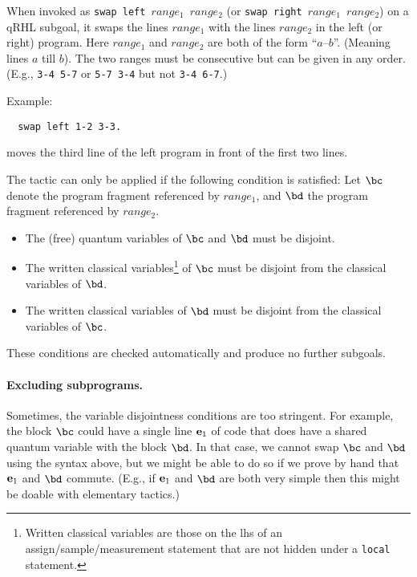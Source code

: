 \documentclass{article}
\begin{document}

When invoked as \texttt{swap left $\mathit{range_1}$ $\mathit{range_2}$} (or \texttt{swap
  right $\mathit{range_1}$ $\mathit{range_2}$}) on a qRHL subgoal, it swaps the lines $\mathit{range_1}$ with the lines $\mathit{range_2}$ in the left (or right) program.
Here $\mathit{range_1}$ and $\mathit{range_2}$ are both of the form ``$a$--$b$''.
(Meaning lines $a$ till $b$).
The two ranges must be consecutive but can be given in any order.
(E.g., \texttt{3-4 5-7} or \texttt{5-7 3-4} but not \texttt{3-4 6-7}.)

Example:
\begin{lstlisting}
  swap left 1-2 3-3.
\end{lstlisting}
moves the third line of the left program in front of the first two lines.

\medskip

The tactic can only be applied if the following condition is
satisfied:
Let $\bc$ denote the program fragment referenced by $\mathit{range_1}$, and $\bd$ the program fragment referenced by $\mathit{range_2}$.
\begin{itemize}
\item The (free) quantum variables of $\bc$ and $\bd$ must be disjoint.
\item The written classical variables\footnote{Written classical variables
    are those on the lhs of an assign/sample/measurement statement
    that are not hidden under a \texttt{local} statement.}
  of $\bc$ must be disjoint from the classical variables of $\bd$.
\item The written classical variables of $\bd$ must be disjoint from the classical variables of $\bc$.
\end{itemize}
These conditions are checked automatically and produce no further subgoals.

\medskip

\paragraph{Excluding subprograms.} Sometimes, the variable disjointness conditions are too stringent.
For example, the block $\bc$ could have a single line $\mathbf e_1$ of code that does have a shared quantum variable with the block $\bd$.
In that case, we cannot swap $\bc$ and $\bd$ using the syntax above, but we might be able to do so if we prove by hand that $\mathbf e_1$ and $\bd$ commute.
(E.g., if $\mathbf e_1$ and $\bd$ are both very simple then this might be doable with elementary tactics.)
\end{document}
